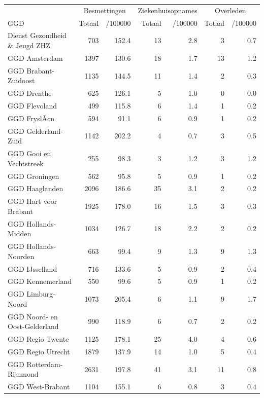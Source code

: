 \documentclass[
  english,
  man,floatsintext]{apa6}
\begin{document}
\begin{table}
\centering\begingroup\fontsize{10}{12}\selectfont

\begin{threeparttable}
\begin{tabular}{lrrrrrr}
\toprule
\multicolumn{1}{c}{ } & \multicolumn{2}{c}{Besmettingen} & \multicolumn{2}{c}{Ziekenhuisopnames} & \multicolumn{2}{c}{Overleden} \\
\cmidrule(l{3pt}r{3pt}){2-3} \cmidrule(l{3pt}r{3pt}){4-5} \cmidrule(l{3pt}r{3pt}){6-7}
GGD & Totaal & /100000 & Totaal & /100000 & Totaal & /100000\\
\midrule
Dienst Gezondheid \& Jeugd ZHZ & 703 & 152.4 & 13 & 2.8 & 3 & 0.7\\
GGD Amsterdam & 1397 & 130.6 & 18 & 1.7 & 13 & 1.2\\
GGD Brabant-Zuidoost & 1135 & 144.5 & 11 & 1.4 & 2 & 0.3\\
GGD Drenthe & 625 & 126.1 & 5 & 1.0 & 0 & 0.0\\
GGD Flevoland & 499 & 115.8 & 6 & 1.4 & 1 & 0.2\\
GGD FryslÃ¢n & 594 & 91.1 & 6 & 0.9 & 1 & 0.2\\
GGD Gelderland-Zuid & 1142 & 202.2 & 4 & 0.7 & 3 & 0.5\\
GGD Gooi en Vechtstreek & 255 & 98.3 & 3 & 1.2 & 3 & 1.2\\
GGD Groningen & 562 & 95.8 & 5 & 0.9 & 1 & 0.2\\
GGD Haaglanden & 2096 & 186.6 & 35 & 3.1 & 2 & 0.2\\
GGD Hart voor Brabant & 1925 & 178.0 & 16 & 1.5 & 3 & 0.3\\
GGD Hollands-Midden & 1034 & 126.7 & 18 & 2.2 & 2 & 0.2\\
GGD Hollands-Noorden & 663 & 99.4 & 9 & 1.3 & 9 & 1.3\\
GGD IJsselland & 716 & 133.6 & 5 & 0.9 & 2 & 0.4\\
GGD Kennemerland & 550 & 99.6 & 5 & 0.9 & 1 & 0.2\\
GGD Limburg-Noord & 1073 & 205.4 & 6 & 1.1 & 9 & 1.7\\
GGD Noord- en Oost-Gelderland & 990 & 118.9 & 6 & 0.7 & 2 & 0.2\\
GGD Regio Twente & 1125 & 178.1 & 25 & 4.0 & 4 & 0.6\\
GGD Regio Utrecht & 1879 & 137.9 & 14 & 1.0 & 5 & 0.4\\
GGD Rotterdam-Rijnmond & 2631 & 197.8 & 41 & 3.1 & 11 & 0.8\\
GGD West-Brabant & 1104 & 155.1 & 6 & 0.8 & 3 & 0.4\\

\end{tabular}
\end{threeparttable}
\end{table}
\end{document}
